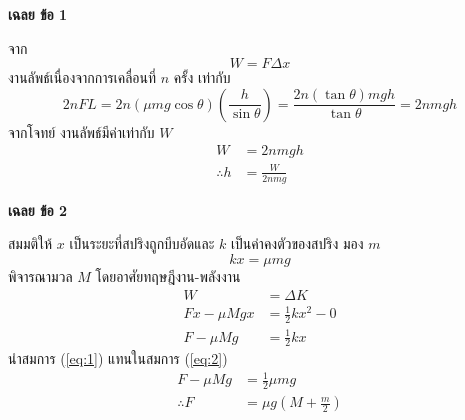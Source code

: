 \documentclass[a4paper,12pt]{article}
\begin{document}
\begin{center}
	\textbf{{\Large เฉลย ข้อ 1}}
\end{center}
จาก
\begin{equation*}
	W=F\Delta x
\end{equation*}
งานลัพธ์เนื่องจากการเคลื่อนที่ \(n\) ครั้ง เท่ากับ
\begin{equation*}
	2nFL=2n(\mu mg\cos\theta)\left( \frac{h}{\sin\theta}\right) =\frac{2n(\tan\theta) mgh}{\tan\theta}=2nmgh
\end{equation*}
จากโจทย์ งานลัพธ์มีค่าเท่ากับ \(W\)
\begin{align*}
	W&=2nmgh\\
	\therefore h&=\frac{W}{2nmg}
\end{align*}
\newpage
\begin{center}
	\textbf{{\Large เฉลย ข้อ 2}}
\end{center}
สมมติให้ \(x\) เป็นระยะที่สปริงถูกบีบอัดและ \(k\) เป็นค่าคงตัวของสปริง
มอง \(m\)
\begin{equation}
	kx=\mu mg\label{eq:1}
\end{equation}
พิจารณามวล \(M\) โดยอาศัยทฤษฎีงาน-พลังงาน
\begin{align}
	W&=\Delta K\nonumber\\
	Fx-\mu Mgx&=\frac{1}{2}kx^2-0\nonumber\\
	F-\mu Mg&=\frac{1}{2}kx\label{eq:2}
\end{align}
นำสมการ (\ref{eq:1}) แทนในสมการ (\ref{eq:2})
\begin{align*}
	F-\mu Mg&=\frac{1}{2}\mu mg\\
	\therefore F&=\mu g\left( M+\frac{m}{2}\right)
\end{align*}
\end{document}
